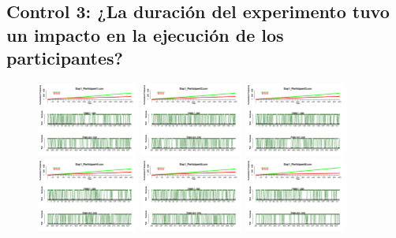 \subsection{Control 3: ¿La duración del experimento tuvo un impacto en la ejecución de los participantes?}


\begin{figure}[th]
\centering
\includegraphics[width=0.30\textwidth]{Figures/Success_Exp1_P1} \includegraphics[width=0.30\textwidth]{Figures/Success_Exp1_P2} \includegraphics[width=0.30\textwidth]{Figures/Success_Exp1_P3}
\includegraphics[width=0.30\textwidth]{Figures/Success_Exp1_P4} \includegraphics[width=0.30\textwidth]{Figures/Success_Exp1_P5} \includegraphics[width=0.30\textwidth]{Figures/Success_Exp1_P6}

\end{figure}
